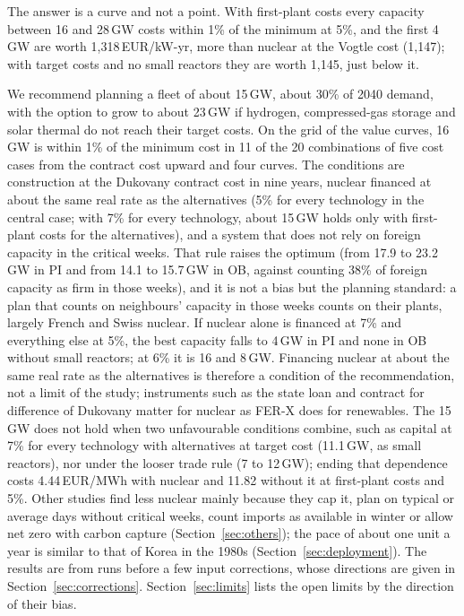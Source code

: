 \documentclass[11pt,a4paper]{article}
\begin{document}
The answer is a curve and not a point. With first-plant costs every capacity between 16 and 28\,GW costs within 1\% of the minimum at 5\%, and the first 4\,GW are worth 1{,}318\,EUR/kW-yr, more than nuclear at the Vogtle cost (1{,}147); with target costs and no small reactors they are worth 1{,}145, just below it.

We recommend planning a fleet of about 15\,GW, about 30\% of 2040 demand, with the option to grow to about 23\,GW if hydrogen, compressed-gas storage and solar thermal do not reach their target costs. On the grid of the value curves, 16\,GW is within 1\% of the minimum cost in 11 of the 20 combinations of five cost cases from the contract cost upward and four curves. The conditions are construction at the Dukovany contract cost in nine years, nuclear financed at about the same real rate as the alternatives (5\% for every technology in the central case; with 7\% for every technology, about 15\,GW holds only with first-plant costs for the alternatives), and a system that does not rely on foreign capacity in the critical weeks. That rule raises the optimum (from 17.9 to 23.2\,GW in PI and from 14.1 to 15.7\,GW in OB, against counting 38\% of foreign capacity as firm in those weeks), and it is not a bias but the planning standard: a plan that counts on neighbours' capacity in those weeks counts on their plants, largely French and Swiss nuclear. If nuclear alone is financed at 7\% and everything else at 5\%, the best capacity falls to 4\,GW in PI and none in OB without small reactors; at 6\% it is 16 and 8\,GW. Financing nuclear at about the same real rate as the alternatives is therefore a condition of the recommendation, not a limit of the study; instruments such as the state loan and contract for difference of Dukovany matter for nuclear as FER-X does for renewables. The 15\,GW does not hold when two unfavourable conditions combine, such as capital at 7\% for every technology with alternatives at target cost (11.1\,GW, as small reactors), nor under the looser trade rule (7 to 12\,GW); ending that dependence costs 4.44\,EUR/MWh with nuclear and 11.82 without it at first-plant costs and 5\%. Other studies find less nuclear mainly because they cap it, plan on typical or average days without critical weeks, count imports as available in winter or allow net zero with carbon capture (Section~\ref{sec:others}); the pace of about one unit a year is similar to that of Korea in the 1980s (Section~\ref{sec:deployment}). The results are from runs before a few input corrections, whose directions are given in Section~\ref{sec:corrections}. Section~\ref{sec:limits} lists the open limits by the direction of their bias.
\end{document}
